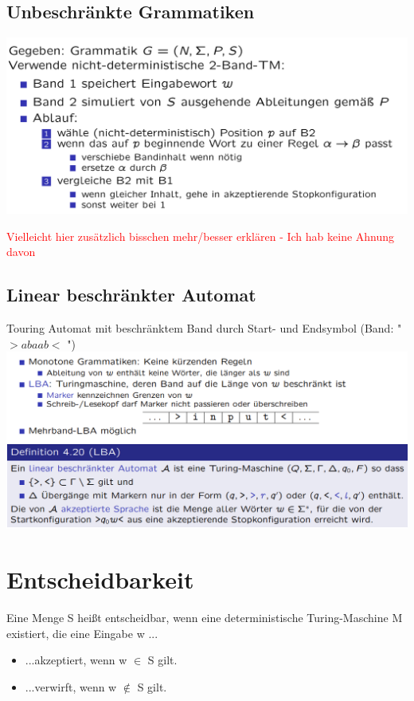 \documentclass[12pt,a4paper]{article}
\begin{document}
	\subsection{Unbeschränkte Grammatiken}
	\begin{center}
		\includegraphics[width=\textwidth]{Bilder/Typ0Grammatik.png}
	\end{center}
	\textcolor{red}{Vielleicht hier zusätzlich bisschen mehr/besser erklären - Ich hab keine Ahnung davon}

	\subsection{Linear beschränkter Automat}
		Touring Automat mit beschränktem Band durch Start- und Endsymbol (Band: " $>abaab<$ ")\\
		\includegraphics[width=\textwidth]{Bilder/l-b-turing.PNG}


\section{Entscheidbarkeit}
	Eine Menge S heißt entscheidbar, wenn eine deterministische Turing-Maschine M existiert, die eine Eingabe w ...
	\begin{itemize}
		\item ...akzeptiert, wenn w $\in$ S gilt.
		\item ...verwirft, wenn w $\notin$ S gilt.
	\end{itemize}
\end{document}

